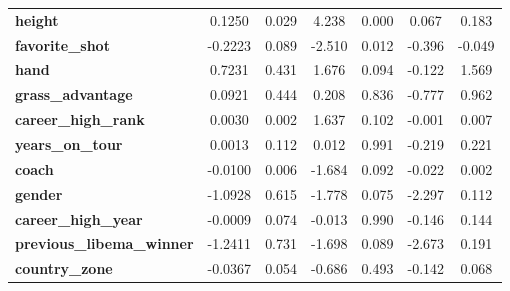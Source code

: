 \begin{center}
\begin{tabular}{lcccccc}
\textbf{height}                   &       0.1250  &        0.029     &     4.238  &         0.000        &        0.067    &        0.183     \\
\textbf{favorite\_shot}           &      -0.2223  &        0.089     &    -2.510  &         0.012        &       -0.396    &       -0.049     \\
\textbf{hand}                     &       0.7231  &        0.431     &     1.676  &         0.094        &       -0.122    &        1.569     \\
\textbf{grass\_advantage}         &       0.0921  &        0.444     &     0.208  &         0.836        &       -0.777    &        0.962     \\
\textbf{career\_high\_rank}       &       0.0030  &        0.002     &     1.637  &         0.102        &       -0.001    &        0.007     \\
\textbf{years\_on\_tour}          &       0.0013  &        0.112     &     0.012  &         0.991        &       -0.219    &        0.221     \\
\textbf{coach}                    &      -0.0100  &        0.006     &    -1.684  &         0.092        &       -0.022    &        0.002     \\
\textbf{gender}                   &      -1.0928  &        0.615     &    -1.778  &         0.075        &       -2.297    &        0.112     \\
\textbf{career\_high\_year}       &      -0.0009  &        0.074     &    -0.013  &         0.990        &       -0.146    &        0.144     \\
\textbf{previous\_libema\_winner} &      -1.2411  &        0.731     &    -1.698  &         0.089        &       -2.673    &        0.191     \\
\textbf{country\_zone}            &      -0.0367  &        0.054     &    -0.686  &         0.493        &       -0.142    &        0.068     \\
\bottomrule
\end{tabular}
\end{center}